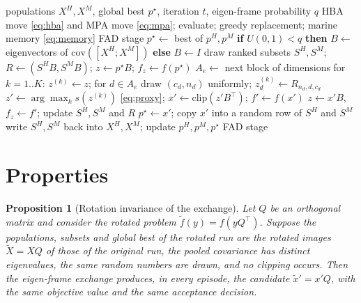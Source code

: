 \documentclass[preprint,12pt,authoryear]{elsarticle}
\newtheorem{proposition}{Proposition}
\theoremstyle{remark}
\begin{document}
\begin{algorithm}[!htbp]
\caption{One iteration of EIG-MPHBS. Lines~\ref{line:frame}, \ref{line:proj} and~\ref{line:back} differ from MPHBS-R.}
\label{alg:iteration}
\small
\begin{algorithmic}[1]
\Require populations $X^H,X^M$, global best $p^\star$, iteration $t$, eigen-frame probability $q$
\State HBA move \eqref{eq:hba} and MPA move \eqref{eq:mpa}; evaluate; greedy replacement; marine memory
\eqref{eq:memory} 
 FAD stage \EndIf
\State $p^\star\gets$ best of $p^H,p^M$
\State \textbf{if} $U(0,1)<q$ \textbf{then} $B\gets$ eigenvectors of $\mathrm{cov}([X^H;X^M])$ \textbf{else} $B\gets I$
 \label{line:frame}
\State draw ranked subsets $S^H,S^M$; $R\gets(S^HB, S^MB)$; $z\gets p^\star B$; $f_z\gets f(p^\star)$
 \label{line:proj}
  \State $A_e\gets$ next block of dimensions
  \State for $k=1..K$: $z^{(k)}\gets z$; for $d\in A_e$ draw $(c_d,n_d)$ uniformly; $z^{(k)}_d\gets R_{n_d,d,c_d}$
  \State $z'\gets\arg\max_k s(z^{(k)})$ \eqref{eq:proxy}; $x'\gets\mathrm{clip}(z'B^\top)$; $f'\gets f(x')$
   \label{line:back}
   $z\gets x'B$, $f_z\gets f'$; update $S^H,S^M$ and $R$\EndIf
   $p^\star\gets x'$; copy $x'$ into a random row of $S^H$ and $S^M$\EndIf
\EndFor
\State write $S^H,S^M$ back into $X^H,X^M$; update $p^H,p^M,p^\star$
 FAD stage \EndIf
\end{algorithmic}
\end{algorithm}

\section{Properties}
\label{sec:theory}

\begin{proposition}[Rotation invariance of the exchange]
\label{prop:invariance}
Let $Q$ be an orthogonal matrix and consider the rotated problem $\tilde f(y)=f(yQ^\top)$. Suppose the populations,
subsets and global best of the rotated run are the rotated images $\tilde X = XQ$ of those of the original run, the
pooled covariance has distinct eigenvalues, the same random numbers are drawn, and no clipping occurs. Then the
eigen-frame exchange produces, in every episode, the candidate $\tilde x'=x'Q$, with the same objective value and the
same acceptance decision.
\end{proposition}
\end{document}
